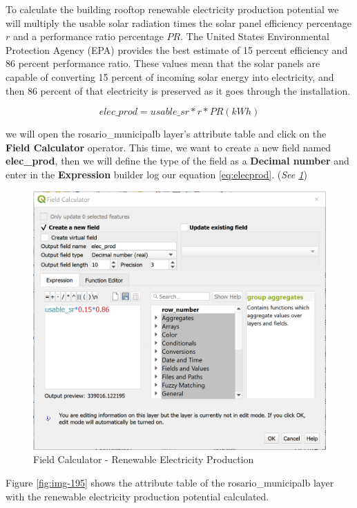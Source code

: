 \documentclass[
]{book}
\begin{document}
To calculate the building rooftop renewable electricity production potential we will multiply the usable solar radiation times the solar panel efficiency percentage \(r\) and a performance ratio percentage \(PR\). The United States Environmental Protection Agency (EPA) provides the best estimate of 15 percent efficiency and 86 percent performance ratio. These values mean that the solar panels are capable of converting 15 percent of incoming solar energy into electricity, and then 86 percent of that electricity is preserved as it goes through the installation.

\begin{equation}
elec\_prod = usable\_sr * r * PR (kWh)
\label{eq:elecprod}
\end{equation}

we will open the {rosario\_municipalb} layer's attribute table and click on the \textbf{Field Calculator} operator. This time, we want to create a new field named \textbf{elec\_prod}, then we will define the type of the field as a \textbf{Decimal number} and enter in the \textbf{Expression} builder log our equation \eqref{eq:elecprod}. (\emph{See \ref{fig:img-194}})

\begin{figure}

{\centering \includegraphics[width=0.7\linewidth]{images/fieldc3} 

}

\caption{Field Calculator - Renewable Electricity Production}\label{fig:img-194}
\end{figure}

Figure \ref{fig:img-195} shows the attribute table of the {rosario\_municipalb} layer with the renewable electricity production potential calculated.
\end{document}
